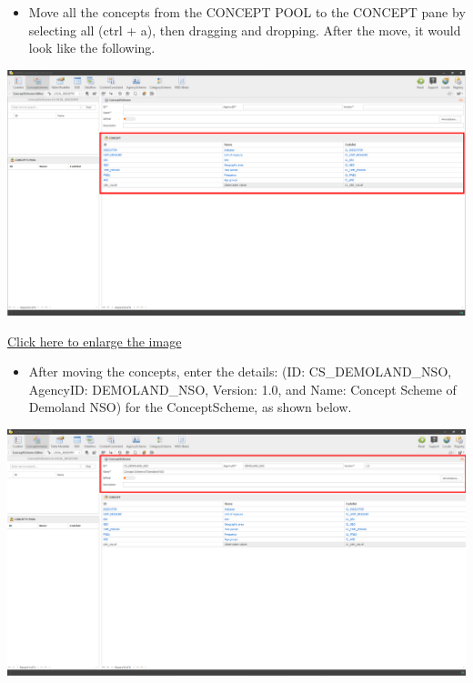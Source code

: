 \documentclass[
]{book}
\providecommand{\tightlist}{%
  \setlength{\itemsep}{0pt}\setlength{\parskip}{0pt}}
\begin{document}
\begin{itemize}
\tightlist
\item
  Move all the concepts from the CONCEPT POOL to the CONCEPT pane by selecting all (ctrl + a), then dragging and dropping. After the move, it would look like the following.
\end{itemize}

\begin{center}\includegraphics[width=1\linewidth]{./images/image280} \end{center}

\href{images/image280.png}{Click here to enlarge the image}

\begin{itemize}
\tightlist
\item
  After moving the concepts, enter the details: (ID: CS\_DEMOLAND\_NSO, AgencyID: DEMOLAND\_NSO, Version: 1.0, and Name: Concept Scheme of Demoland NSO) for the ConceptScheme, as shown below.
\end{itemize}

\begin{center}\includegraphics[width=1\linewidth]{./images/image281} \end{center}
\end{document}
